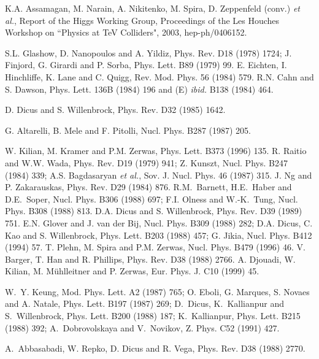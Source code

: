 \begin{thebibliography}{999}
 K.A. Assamagan, M. Narain, A. Nikitenko, M. Spira, 
D. Zeppenfeld (conv.) {\it et al.}, Report of the Higgs Working Group,
Proceedings of the Les Houches Workshop on ``Physics at 
TeV Colliders", 2003, hep-ph/0406152. 

S.L. Glashow, D. Nanopoulos and A. Yildiz, Phys. Rev. D18 (1978) 1724;   
J. Finjord, G. Girardi and P. Sorba, Phys. Lett. B89 (1979) 99.  
%
E. Eichten, I. Hinchliffe, K. Lane and C. Quigg, Rev. Mod. Phys. 56 (1984) 579.
%
 R.N. Cahn and S. Dawson, Phys. Lett. 136B (1984) 196
and (E) {\it ibid.} B138 (1984) 464.

 D. Dicus and S. Willenbrock, Phys. Rev. D32 (1985) 1642.

 G. Altarelli, B. Mele and F. Pitolli, Nucl. Phys. B287 
(1987) 205.

 W. Kilian, M. Kramer and P.M. Zerwas, Phys. Lett. B373 
(1996) 135. 
%
R. Raitio and W.W. Wada, Phys. Rev. D19 (1979) 941; 
Z. Kunszt, Nucl. Phys. B247 (1984) 339;
A.S. Bagdasaryan {\it et al.}, Sov. J. Nucl. Phys. 46 (1987) 315. 
%
 J. Ng and P. Zakarauskas, Phys. Rev. D29 (1984) 876. 
%
 R.M.~Barnett, H.E.~Haber and D.E.~Soper, Nucl. Phys. 
B306 (1988) 697; F.I. Olness and W.-K.~Tung, Nucl. Phys. B308 (1988) 813. 
%
D.A. Dicus and S. Willenbrock, Phys. Rev. D39  (1989) 751. 
 E.N. Glover and J. van der Bij, Nucl. Phys. B309 (1988) 
282; D.A. Dicus, C. Kao and S. Willenbrock, Phys. Lett. B203 (1988) 457;
G. Jikia, Nucl. Phys. B412 (1994) 57.   
%
T. Plehn, M. Spira and P.M. Zerwas, Nucl. Phys. B479 (1996) 46. 
%
 V. Barger, T. Han and R. Phillips, Phys. Rev. D38 (1988) 2766. 
%
 A. Djouadi, W. Kilian, M. M\"uhlleitner and P. Zerwas, 
Eur. Phys. J. C10 (1999) 45. 

W.~Y. Keung, Mod. Phys. Lett. A2 (1987) 765; 
O. Eboli, G. Marques, S. Novaes and A. Natale, Phys. Lett. B197 (1987) 269;  
D.~Dicus, K.~Kallianpur and S.~Willenbrock, Phys. Lett. B200 (1988) 187; 
K.~Kallianpur, Phys. Lett. B215 (1988) 392; 
A.~Dobrovolskaya and V.~Novikov, Z. Phys. C52 (1991) 427.  

A.~Abbasabadi, W. Repko, D. Dicus and R. Vega, Phys. Rev. D38 (1988) 2770. 


\end{thebibliography}
